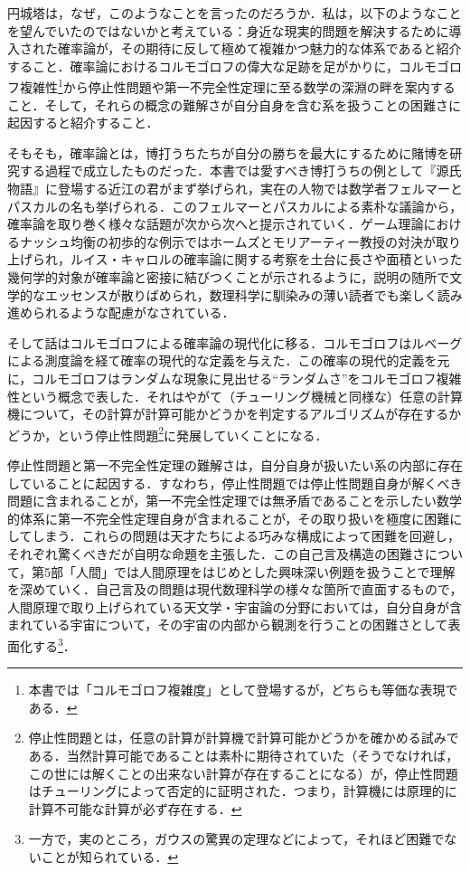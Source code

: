 \documentclass[10pt, a5paper, twoside]{jsarticle}
\theoremstyle{definition}
\begin{document}
		円城塔は，なぜ，このようなことを言ったのだろうか．私は，以下のようなことを望んでいたのではないかと考えている：身近な現実的問題を解決するために導入された確率論が，その期待に反して極めて複雑かつ魅力的な体系であると紹介すること．確率論におけるコルモゴロフの偉大な足跡を足がかりに，コルモゴロフ複雑性\footnote{本書では「コルモゴロフ複雑度」として登場するが，どちらも等価な表現である．}から停止性問題や第一不完全性定理に至る数学の深淵の畔を案内すること．そして，それらの概念の難解さが自分自身を含む系を扱うことの困難さに起因すると紹介すること．

		そもそも，確率論とは，博打うちたちが自分の勝ちを最大にするために賭博を研究する過程で成立したものだった．本書では愛すべき博打うちの例として『源氏物語』に登場する近江の君がまず挙げられ，実在の人物では数学者フェルマーとパスカルの名も挙げられる．このフェルマーとパスカルによる素朴な議論から，確率論を取り巻く様々な話題が次から次へと提示されていく．ゲーム理論におけるナッシュ均衡の初歩的な例示ではホームズとモリアーティー教授の対決が取り上げられ，ルイス・キャロルの確率論に関する考察を土台に長さや面積といった幾何学的対象が確率論と密接に結びつくことが示されるように，説明の随所で文学的なエッセンスが散りばめられ，数理科学に馴染みの薄い読者でも楽しく読み進められるような配慮がなされている．

		そして話はコルモゴロフによる確率論の現代化に移る．コルモゴロフはルベーグによる測度論を経て確率の現代的な定義を与えた．この確率の現代的定義を元に，コルモゴロフはランダムな現象に見出せる“ランダムさ”をコルモゴロフ複雑性という概念で表した．それはやがて（チューリング機械と同様な）任意の計算機について，その計算が計算可能かどうかを判定するアルゴリズムが存在するかどうか，という停止性問題\footnote{停止性問題とは，任意の計算が計算機で計算可能かどうかを確かめる試みである．当然計算可能であることは素朴に期待されていた（そうでなければ，この世には解くことの出来ない計算が存在することになる）が，停止性問題はチューリングによって否定的に証明された．つまり，計算機には原理的に計算不可能な計算が必ず存在する．}に発展していくことになる．

		停止性問題と第一不完全性定理の難解さは，自分自身が扱いたい系の内部に存在していることに起因する．すなわち，停止性問題では停止性問題自身が解くべき問題に含まれることが，第一不完全性定理では無矛盾であることを示したい数学的体系に第一不完全性定理自身が含まれることが，その取り扱いを極度に困難にしてしまう．これらの問題は天才たちによる巧みな構成によって困難を回避し，それぞれ驚くべきだが自明な命題を主張した．この自己言及構造の困難さについて，第5部「人間」では人間原理をはじめとした興味深い例題を扱うことで理解を深めていく．自己言及の問題は現代数理科学の様々な箇所で直面するもので，人間原理で取り上げられている天文学・宇宙論の分野においては，自分自身が含まれている宇宙について，その宇宙の内部から観測を行うことの困難さとして表面化する\footnote{一方で，実のところ，ガウスの驚異の定理などによって，それほど困難でないことが知られている．}．
\end{document}
